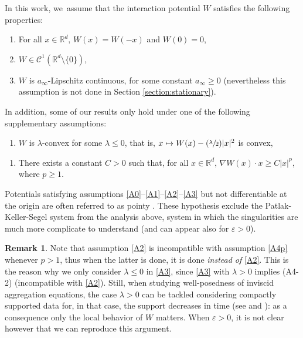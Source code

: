 \documentclass[JEP,XML,SOM,Unicode, NoFloatCountersInSection,published]{cedram}
\newcommand\mto{\mathchoice{\longmapsto}{\mapsto}{\mapsto}{\mapsto}}
\newcommand{\Psfrac}[2]{(\sfrac{#1}{#2})}
\def\RR{\mathbb{R}}
\def\eps{\varepsilon}
\def\calC{{\mathcal C}}
\theoremstyle{plain}
\theoremstyle{definition}
\newtheorem{remark}[theorem]{Remark}
\begin{document}
In this work, we~assume that the interaction potential $W$ satisfies the following properties:
\begin{enumerate}\renewcommand{\theenumi}{\textup{A}\arabic{enumi}}\setcounter{enumi}{-1}
\item\label{A0}
For all $x \in \RR^d, \, W(x)=W(-x)$ and $W(0)=0$,
\item\label{A1}
$W\in \calC^1(\RR^d\setminus\{0\})$,
\item\label{A2}
$W$ is $a_\infty$-Lipschitz continuous, for some constant $a_\infty \geq 0$ (nevertheless this assumption is not done in Section \ref{section:stationary}).
\end{enumerate}
In addition, some of our results only hold under one of the following supplementary assumptions:
\begin{enumerate}\renewcommand{\theenumi}{\textup{A}\arabic{enumi}}\setcounter{enumi}{2}
\item\label{A3}
$W$ is $\lambda$-convex for some $\lambda \leq 0$, that is, $x \mto W(x) - \Psfrac{\lambda}{2} |x|^2$ is convex,
\end{enumerate}
\begin{enumerate}\renewcommand{\theenumi}{\textup{A}\arabic{enumi}\textup{-}$p$}\setcounter{enumi}{3}
\item\label{A4p}
There exists a constant $C>0$ such that, for all $x \in \RR^d, \,\nabla W(x) \cdot x \geq C |x|^p$, where $p \geq 1$.
\end{enumerate}
Potentials satisfying assumptions \eqref{A0}--\eqref{A1}--\eqref{A2}--\eqref{A3}
but not differentiable at the origin are often referred to as pointy \cite{cjlv15,dlv20,lv17}.
These hypothesis exclude the Patlak-Keller-Segel system from the analysis above, system in which the singularities are much more complicate to understand (and can appear also for
$\varepsilon > 0$).
\begin{remark}
Note that assumption \eqref{A2} is incompatible with assumption \eqref{A4p} whenever $p>1$, thus when the latter is done, it is done {\em instead of} \eqref{A2}. This is the reason why we only consider $\lambda \leq 0$ in \eqref{A3}, since \eqref{A3} with $\lambda>0$ implies (A4-2) (incompatible with \eqref{A2}). Still, when studying well-posedness of inviscid aggregation equations, the case $\lambda >0$ can be tackled considering compactly supported data for, in that case, the support decreases in time (see \cite[Th.\,2.1]{dlv20} and \cite[Rem.\,2.14]{figalli11}): as a consequence only the local behavior of $W$ matters. When $\eps >0$, it is not clear however that we can reproduce this argument.
\end{remark}
\end{document}
